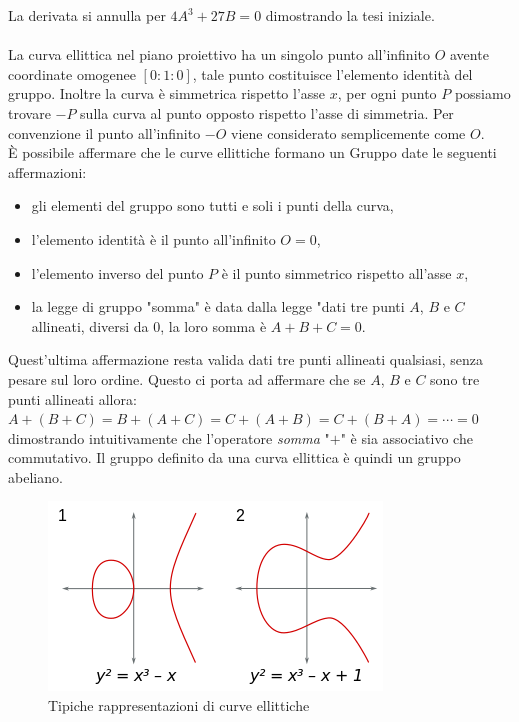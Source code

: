 \documentclass[a4paper,12pt]{tesiinfo}
\begin{document}
La derivata si annulla per $4A^3+27B = 0$ dimostrando la tesi iniziale.\\
\\
La curva ellittica nel piano proiettivo ha un singolo punto all'infinito $O$ avente coordinate omogenee $[0:1:0]$, tale punto costituisce l'elemento identit\`a del gruppo. Inoltre la curva \`e simmetrica rispetto l'asse $x$, per ogni punto $P$ possiamo trovare $-P$ sulla curva al punto opposto rispetto l'asse di simmetria. Per convenzione il punto all'infinito $-O$ viene considerato semplicemente come $O$.\\
\`E possibile affermare che le curve ellittiche formano un Gruppo date le seguenti affermazioni:
\begin{itemize}
    \item gli elementi del gruppo sono tutti e soli i punti della curva,
    \item l'elemento identit\`a \`e il punto all'infinito $O = 0$,
    \item l'elemento inverso del punto $P$ \`e il punto simmetrico rispetto all'asse $x$,
    \item la legge di gruppo "somma" \`e data dalla legge "dati tre punti $A$, $B$ e $C$ allineati, diversi da $0$, la loro somma \`e $A+B+C=0$.
\end{itemize}
Quest'ultima affermazione resta valida dati tre punti allineati qualsiasi, senza pesare sul loro ordine. Questo ci porta ad affermare che se $A$, $B$ e $C$ sono tre punti allineati allora:\\
$A+(B+C)=B+(A+C)=C+(A+B)=C+(B+A)=\cdots = 0$\\
dimostrando intuitivamente che l'operatore \textit{somma} "$+$" \`e sia associativo che commutativo. Il gruppo definito da una curva ellittica \`e quindi un gruppo abeliano.
\begin{figure}[ht]
    \includegraphics[width=.8\textwidth,center]{commonEC}
    \caption{Tipiche rappresentazioni di curve ellittiche}
\end{figure}
\end{document}
